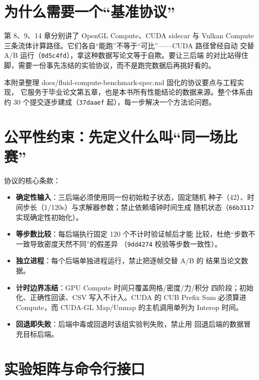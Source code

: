 \section{为什么需要一个``基准协议''}

第 8、9、14 章分别讲了 OpenGL Compute、CUDA sidecar 与 Vulkan Compute
三条流体计算路径。它们各自``能跑''不等于``可比''——CUDA 路径曾经自动
交替 A/B 运行（\texttt{0d5c4fd}），拿这种数据写论文等于自欺。要让三后端
的对比站得住脚，需要一份事先冻结的实验协议，而不是跑完数据后再挑好看的。

本附录整理 docs/fluid-compute-benchmark-spec.md 固化的协议要点与工程实现，
它服务于毕业论文第五章，也是本书所有性能结论的数据来源。整个体系由约
30 个提交逐步建成（\texttt{37daaef} 起），每一步解决一个方法论问题。

\section{公平性约束：先定义什么叫``同一场比赛''}

协议的核心条款：

\begin{itemize}
  \item \textbf{确定性输入}：三后端必须使用同一份初始粒子状态，固定随机
        种子（42）、时间步长（1/120s）与求解器参数；禁止依赖墙钟时间生成
        随机状态（\texttt{66b3117} 实现确定性初始化）。
  \item \textbf{等步数比较}：每后端执行固定 120 个不计时验证帧后才能
        比较，杜绝``步数不一致导致密度天然不同''的假差异
        （\texttt{9dd4274} 校验等步数一致性）。
  \item \textbf{独立进程}：每个后端单独进程运行，禁止把逐帧交替 A/B 的
        结果当论文数据。
  \item \textbf{计时边界冻结}：GPU Compute 时间只覆盖网格/密度/力/积分
        四阶段；初始化、正确性回读、CSV 写入不计入。CUDA 的 CUB Prefix
        Sum 必须算进 Compute，而 CUDA-GL Map/Unmap 的主机调用单列为
        Interop 时间。
  \item \textbf{回退即失败}：后端中毒或回退时该组实验判失败，禁止用
        回退后端的数据冒充目标后端。
\end{itemize}

\section{实验矩阵与命令行接口}

